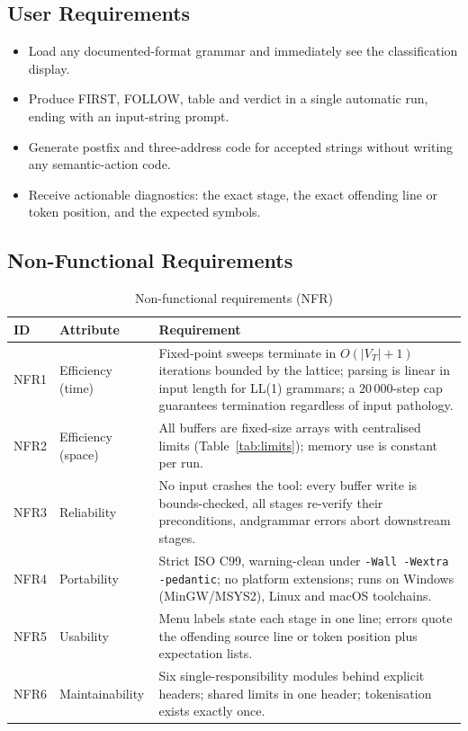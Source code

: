 \documentclass[12pt,a4paper,oneside,openany]{report}
\begin{document}
\subsection{User Requirements}
\begin{itemize}
  \item Load any documented-format grammar and immediately see the
        classification display.
  \item Produce FIRST, FOLLOW, table and verdict in a single automatic
        run, ending with an input-string prompt.
  \item Generate postfix and three-address code for accepted strings
        without writing any semantic-action code.
  \item Receive actionable diagnostics: the exact stage, the exact
        offending line or token position, and the expected symbols.
\end{itemize}

\subsection{Non-Functional Requirements}
\begin{table}[h]
  \caption{Non-functional requirements (NFR)}
  \label{tab:nfr}
  \small
  \begin{tabularx}{\textwidth}{p{1.2cm}p{3.2cm}X}
    \toprule
    \textbf{ID} & \textbf{Attribute} & \textbf{Requirement} \\
    \midrule
    NFR1 & Efficiency (time) & Fixed-point sweeps terminate in
    $O(|V_T|{+}1)$ iterations bounded by the lattice; parsing is linear in
    input length for LL(1) grammars; a 20\,000-step cap guarantees
    termination regardless of input pathology. \\
    NFR2 & Efficiency (space) & All buffers are fixed-size arrays with
    centralised limits (Table~\ref{tab:limits}); memory use is constant
    per run. \\
    NFR3 & Reliability & No input crashes the tool: every buffer write is
    bounds-checked, all stages re-verify their preconditions, andgrammar
    errors abort downstream stages. \\
    NFR4 & Portability & Strict ISO C99, warning-clean under
    \texttt{-Wall -Wextra -pedantic}; no platform extensions; runs on
    Windows (MinGW/MSYS2), Linux and macOS toolchains. \\
    NFR5 & Usability & Menu labels state each stage in one line; errors
    quote the offending source line or token position plus expectation
    lists. \\
    NFR6 & Maintainability & Six single-responsibility modules behind
    explicit headers; shared limits in one header; tokenisation exists
    exactly once. \\
    \bottomrule
  \end{tabularx}
\end{table}
\end{document}

